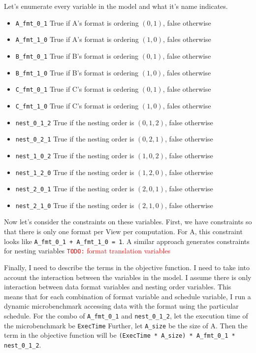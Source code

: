 \documentclass{article}
\newcommand{\todo}[1]{{\textcolor{red}{{\tt{TODO:}}\,\,#1 }}}
\begin{document}
Let's enumerate every variable in the model and what it's name indicates. 
\begin{itemize}
    \item \verb.A_fmt_0_1. True if A's format is ordering $(0,1)$, false otherwise
    \item \verb.A_fmt_1_0. True if A's format is ordering $(1,0)$, fales otherwise
    \item \verb.B_fmt_0_1. True if B's format is ordering $(0,1)$, false otherwise
    \item \verb.B_fmt_1_0. True if B's format is ordering $(1,0)$, fales otherwise
    \item \verb.C_fmt_0_1. True if C's format is ordering $(0,1)$, false otherwise
    \item \verb.C_fmt_1_0. True if C's format is ordering $(1,0)$, fales otherwise
    \item \verb.nest_0_1_2. True if the nesting order is $(0,1,2)$, false otherwise
    \item \verb.nest_0_2_1. True if the nesting order is $(0,2,1)$, false otherwise
    \item \verb.nest_1_0_2. True if the nesting order is $(1,0,2)$, false otherwise
    \item \verb.nest_1_2_0. True if the nesting order is $(1,2,0)$, false otherwise
    \item \verb.nest_2_0_1. True if the nesting order is $(2,0,1)$, false otherwise
    \item \verb.nest_2_1_0. True if the nesting order is $(2,1,0)$, false otherwise
\end{itemize}

Now let's consider the constraints on these variables. 
First, we have constraints so that there is only one format per View per computation. For A, this constraint looks like \verb.A_fmt_0_1 + A_fmt_1_0 = 1..
A similar approach generates constraints for nesting variables
\todo{format translation variables}

Finally, I need to describe the terms in the objective function.
I need to take into account the interaction between the variables in the model.
I assume there is only interaction between data format variables and nesting order variables. 
This means that for each combination of format variable and schedule variable, I run a dynamic microbenchmark accessing data with the format using the particular schedule. 
For the combo of \verb.A_fmt_0_1. and \verb.nest_0_1_2., let the execution time of the microbenchmark be \verb.ExecTime.
Further, let \verb.A_size. be the size of A. 
Then the term in the objective function will be \verb.(ExecTime * A_size) * A_fmt_0_1 * nest_0_1_2..
\end{document}
